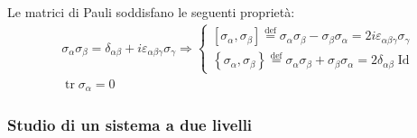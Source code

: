 \documentclass[10pt, a4paper]{scrartcl}
\numberwithin{equation}{subsection}
\theoremstyle{style2}
\theoremstyle{style1}
\begin{document}
Le matrici di Pauli soddisfano le seguenti propriet\`a:
\begin{equation}
	\begin{split}
		&\sigma _\alpha  \sigma _\beta  = \delta _{\alpha  \beta}  + i \varepsilon _{\alpha \beta \gamma} \sigma _\gamma\Rightarrow \begin{cases}
			[\sigma _\alpha , \sigma _\beta ]\overset{\text{def}}{=} \sigma _\alpha \sigma _\beta  - \sigma _\beta \sigma _\alpha  = 2i \varepsilon _{\alpha  \beta  \gamma} \sigma _\gamma\\
\left\{ \sigma _\alpha  , \sigma _\beta  \right\} \overset{\text{def}}{=} \sigma _\alpha  \sigma _\beta  + \sigma _\beta  \sigma _\alpha = 2 \delta _{\alpha  \beta } \operatorname{Id}
		\end{cases}  \\
		& \operatorname{tr} \sigma _\alpha  = 0 
	\end{split}
\end{equation}
\subsubsection{Studio di un sistema a due livelli}
\end{document}
